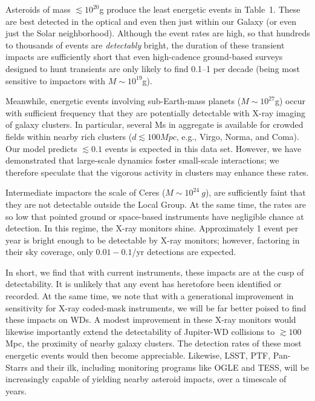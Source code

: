 Asteroids of mass $\lesssim 10^{20}$g produce the least energetic events in Table~1.  These are best detected in the optical and even then just within our Galaxy (or even just the Solar neighborhood).  Although the event rates are high, so that hundreds to thousands of events are {\em detectably} bright, the  duration of these transient impacts are sufficiently short that even high-cadence ground-based surveys designed to hunt transients are only likely to find 0.1--1 per decade (being most sensitive to impactors with $M\sim10^{19}$g).  


Meanwhile, energetic events involving sub-Earth-mass planets ($M \sim 10^{27}$g) occur with sufficient frequency that they are potentially detectable with X-ray imaging of galaxy clusters.  In particular, several Ms in aggregate is available for crowded fields within nearby rich clusters ($d \lesssim 100 Mpc$, e.g., Virgo, Norma, and Coma).   Our model predicts $\lesssim 0.1$ events is expected in this data set.  However,  we have demonstrated that large-scale dynamics foster small-scale interactions; we therefore speculate that the vigorous activity in clusters may enhance these rates.  


Intermediate impactors the scale of Ceres ($M \sim 10^{24}~g$), are sufficiently faint that they are not detectable outside the Local Group.  At the same time, the rates are so low that pointed ground or space-based instruments have negligible chance at detection.  In this regime, the X-ray monitors shine.  Approximately 1 event per year is bright enough to be detectable by X-ray monitors; however, factoring in their sky coverage, only $0.01-0.1$/yr detections are expected.  


In short, we find that with current instruments, these impacts are at the cusp of detectability.  It is unlikely that any event has heretofore been identified or recorded.  At the same time, we note that with a generational improvement in sensitivity for X-ray coded-mask instruments, we will be far better poised to find these impacts on WDs.  A modest improvement in these X-ray monitors    
would likewise importantly extend the detectability of Jupiter-WD collisions to $\gtrsim 100$ Mpc, the proximity of nearby galaxy clusters.  The detection rates of these most energetic events would then become appreciable.   Likewise, LSST, PTF, Pan-Starrs and their ilk, including monitoring programs like OGLE and TESS, will be increasingly capable of yielding nearby asteroid impacts, over a timescale of years.    
